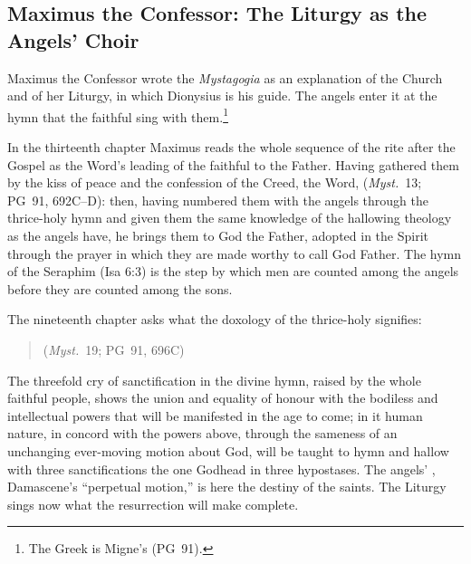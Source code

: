 \sectionguard
\subsection{Maximus the Confessor: The Liturgy as the Angels' Choir}\label{sec:bz-maximus}

Maximus the Confessor wrote the \emph{Mystagogia} as an explanation of
the Church and of her Liturgy, in which Dionysius is his guide. The angels enter it
at the hymn that the faithful sing with them.\footnote{The Greek is
Migne's (PG~91).}

In the thirteenth chapter Maximus reads the whole sequence of the rite
after the Gospel as the Word's leading of the faithful to the Father.
Having gathered them by the kiss of peace and the confession of the Creed,
the Word, 
(\emph{Myst.}\ 13; PG~91, 692C--D): then, having numbered them with the
angels through the thrice-holy hymn and given them the same knowledge of the
hallowing theology as the angels have, he brings them to God the Father,
adopted in the Spirit through the prayer in which they are made worthy to
call God Father. The hymn of the Seraphim (Isa 6:3) is the step by which men
are counted among the angels before they are counted among the sons.

The nineteenth chapter asks what the doxology of the thrice-holy signifies:

\begin{quote}
 (\emph{Myst.}\ 19; PG~91, 696C)
\end{quote}

\noindent The threefold cry of sanctification in the divine hymn, raised by
the whole faithful people, shows the union and equality of honour with the
bodiless and intellectual powers that will be manifested in the age to
come; in it human nature, in concord with the powers above, through the
sameness of an unchanging ever-moving motion about God, will be taught to
hymn and hallow with three sanctifications the one Godhead in three
hypostases. The angels' , Damascene's ``perpetual motion,''
is here the destiny of the saints. The Liturgy sings now what the
resurrection will make complete.

